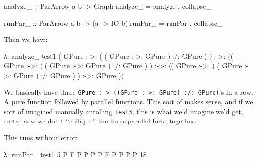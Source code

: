 \documentclass[]{article}
\newenvironment{Shaded}{}{}
\newcommand{\DataTypeTok}[1]{\textcolor[rgb]{0.56,0.13,0.00}{#1}}
\newcommand{\DecValTok}[1]{\textcolor[rgb]{0.25,0.63,0.44}{#1}}
\newcommand{\NormalTok}[1]{#1}
\newcommand{\OperatorTok}[1]{\textcolor[rgb]{0.40,0.40,0.40}{#1}}
\newcommand{\OtherTok}[1]{\textcolor[rgb]{0.00,0.44,0.13}{#1}}
\begin{document}
\begin{Shaded}
\begin{Highlighting}[]
\OtherTok{analyze\_ ::} \DataTypeTok{ParArrow}\NormalTok{ a b }\OtherTok{{-}>} \DataTypeTok{Graph}
\NormalTok{analyze\_ }\OtherTok{=}\NormalTok{ analyze\textquotesingle{} }\OperatorTok{.}\NormalTok{ collapse\_}

\OtherTok{runPar\_ ::} \DataTypeTok{ParArrow}\NormalTok{ a b }\OtherTok{{-}>}\NormalTok{ (a }\OtherTok{{-}>} \DataTypeTok{IO}\NormalTok{ b)}
\NormalTok{runPar\_ }\OtherTok{=}\NormalTok{ runPar\textquotesingle{} }\OperatorTok{.}\NormalTok{ collapse\_}
\end{Highlighting}
\end{Shaded}

Then we have:

\begin{Shaded}
\begin{Highlighting}[]
\NormalTok{λ}\OperatorTok{:}\NormalTok{ analyze\_ test1}
\NormalTok{(}
  \DataTypeTok{GPure} \OperatorTok{:{-}>:}\NormalTok{ ( ( }\DataTypeTok{GPure} \OperatorTok{:{-}>:} \DataTypeTok{GPure}\NormalTok{ ) }\OperatorTok{:/:} \DataTypeTok{GPure}\NormalTok{ )}
\NormalTok{) }\OperatorTok{:{-}>:}\NormalTok{ ((}
  \DataTypeTok{GPure} \OperatorTok{:{-}>:}\NormalTok{ ( ( }\DataTypeTok{GPure} \OperatorTok{:{-}>:} \DataTypeTok{GPure}\NormalTok{ ) }\OperatorTok{:/:} \DataTypeTok{GPure}\NormalTok{ )}
\NormalTok{) }\OperatorTok{:{-}>:}\NormalTok{ ((}
  \DataTypeTok{GPure} \OperatorTok{:{-}>:}\NormalTok{ ( ( }\DataTypeTok{GPure} \OperatorTok{:{-}>:} \DataTypeTok{GPure}\NormalTok{ ) }\OperatorTok{:/:} \DataTypeTok{GPure}\NormalTok{ )}
\NormalTok{) }\OperatorTok{:{-}>:}
  \DataTypeTok{GPure}
\NormalTok{))}
\end{Highlighting}
\end{Shaded}

We basically have three
\texttt{GPure\ :-\textgreater{}\ ((GPure\ :-\textgreater{}:\ GPure)\ :/:\ GPure)}'s
in a row. A pure function followed by parallel functions. This sort of makes
sense, and if we sort of imagined manually unrolling \texttt{test3}, this is
what we'd imagine we'd get, sorta. now we don't ``collapse'' the three parallel
forks together.

This runs without error:

\begin{Shaded}
\begin{Highlighting}[]
\NormalTok{λ}\OperatorTok{:}\NormalTok{ runPar\_ test1 }\DecValTok{5}
\DataTypeTok{P}
\DataTypeTok{F}
\DataTypeTok{P}
\DataTypeTok{P}
\DataTypeTok{P}
\DataTypeTok{P}
\DataTypeTok{F}
\DataTypeTok{P}
\DataTypeTok{P}
\DataTypeTok{P}
\DataTypeTok{P}
\DecValTok{18}
\end{Highlighting}
\end{Shaded}
\end{document}
